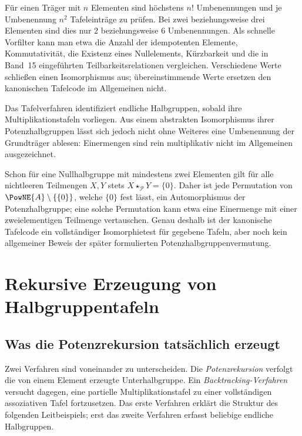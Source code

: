\documentclass[main.tex]{subfiles}
\begin{document}
Für einen Träger mit \(n\) Elementen sind höchstens \(n!\)
Umbenennungen und je Umbenennung \(n^2\) Tafeleinträge zu prüfen.  Bei
zwei beziehungsweise drei Elementen sind dies nur \(2\) beziehungsweise
\(6\) Umbenennungen.  Als schnelle Vorfilter kann man etwa die Anzahl der
idempotenten Elemente, Kommutativität, die Existenz eines Nullelements,
Kürzbarkeit und die in Band~15 eingeführten Teilbarkeitsrelationen
vergleichen.  Verschiedene Werte schließen einen Isomorphismus aus;
übereinstimmende Werte ersetzen den kanonischen Tafelcode im Allgemeinen
nicht.

\begin{remark}
Das Tafelverfahren identifiziert endliche Halbgruppen, sobald ihre
Multiplikationstafeln vorliegen.  Aus einem abstrakten Isomorphismus ihrer
Potenzhalbgruppen lässt sich jedoch nicht ohne Weiteres eine Umbenennung der
Grundträger ablesen: Einermengen sind rein multiplikativ nicht im
Allgemeinen ausgezeichnet.

Schon für eine Nullhalbgruppe mit mindestens zwei Elementen gilt für alle
nichtleeren Teilmengen \(X,Y\) stets
\(X\star_{\mathcal P}Y=\{0\}\).  Daher ist jede Permutation von
\(\PowNE{A}\setminus\{\{0\}\}\), welche \(\{0\}\) fest lässt, ein
Automorphismus der Potenzhalbgruppe; eine solche Permutation kann etwa eine
Einermenge mit einer zweielementigen Teilmenge vertauschen.  Genau deshalb
ist der kanonische Tafelcode ein vollständiger Isomorphietest für gegebene
Tafeln, aber noch kein allgemeiner Beweis der später formulierten
Potenzhalbgruppenvermutung.
\end{remark}

\section{Rekursive Erzeugung von Halbgruppentafeln}

\subsection{Was die Potenzrekursion tatsächlich erzeugt}

Zwei Verfahren sind voneinander zu unterscheiden.  Die
\emph{Potenzrekursion} verfolgt die von einem Element erzeugte
Unterhalbgruppe.  Ein \emph{Backtracking-Verfahren} versucht dagegen, eine
partielle Multiplikationstafel zu einer vollständigen assoziativen Tafel
fortzusetzen.  Das erste Verfahren erklärt die Struktur des folgenden
Leitbeispiels; erst das zweite Verfahren erfasst beliebige endliche
Halbgruppen.
\end{document}
